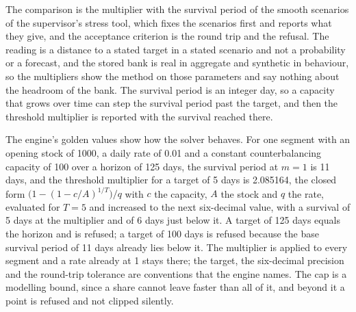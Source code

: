 The comparison is the multiplier with the survival period of the smooth scenarios of the supervisor's stress tool, which fixes the scenarios first and reports what they give, and the acceptance criterion is the
round trip and the refusal. The reading is a distance to a stated target in a stated scenario and not a probability or a forecast, and the stored bank is real in aggregate and synthetic in behaviour, so the multipliers show the
method on those parameters and say nothing about the headroom of the bank. The survival period is an integer day, so a capacity that grows over time can step the survival period past the target, and then the threshold
multiplier is reported with the survival reached there.

The engine's golden values show how the solver behaves. For one segment with an opening stock of 1000, a daily rate of 0.01 and a constant counterbalancing capacity of 100 over a horizon of 125 days, the survival period at $m=1$ is 11 days, and the threshold multiplier for a target of 5 days is
2.085164, the closed form $\big(1-(1-c/A)^{1/T}\big)/q$ with $c$ the capacity, $A$ the stock and $q$ the rate, evaluated for $T=5$ and increased to the next six-decimal value, with a survival of 5 days at the multiplier and of 6 days just below it. A target of 125 days equals the horizon and is refused; a target of 100 days is refused because the base survival
period of 11 days already lies below it. The multiplier is applied to every segment and a rate already at 1 stays there; the target, the six-decimal precision and the round-trip tolerance are conventions that the engine names. The cap is a modelling bound, since a share cannot leave faster than all
of it, and beyond it a point is refused and not clipped silently.

